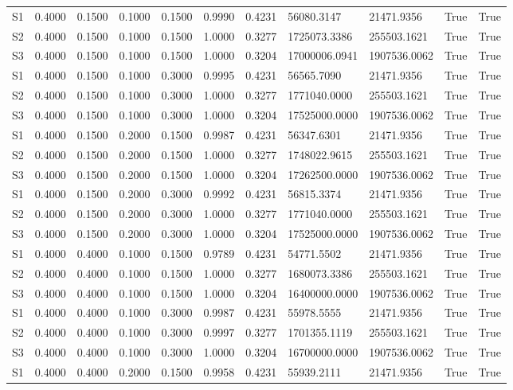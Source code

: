 \documentclass[11pt,a4paper]{article}
\begin{document}
\begin{landscape}
{\begin{longtable}{lllllllllll}
S1 & 0.4000 & 0.1500 & 0.1000 & 0.1500 & 0.9990 & 0.4231 & 56080.3147 & 21471.9356 & True & True \\
S2 & 0.4000 & 0.1500 & 0.1000 & 0.1500 & 1.0000 & 0.3277 & 1725073.3386 & 255503.1621 & True & True \\
S3 & 0.4000 & 0.1500 & 0.1000 & 0.1500 & 1.0000 & 0.3204 & 17000006.0941 & 1907536.0062 & True & True \\
S1 & 0.4000 & 0.1500 & 0.1000 & 0.3000 & 0.9995 & 0.4231 & 56565.7090 & 21471.9356 & True & True \\
S2 & 0.4000 & 0.1500 & 0.1000 & 0.3000 & 1.0000 & 0.3277 & 1771040.0000 & 255503.1621 & True & True \\
S3 & 0.4000 & 0.1500 & 0.1000 & 0.3000 & 1.0000 & 0.3204 & 17525000.0000 & 1907536.0062 & True & True \\
S1 & 0.4000 & 0.1500 & 0.2000 & 0.1500 & 0.9987 & 0.4231 & 56347.6301 & 21471.9356 & True & True \\
S2 & 0.4000 & 0.1500 & 0.2000 & 0.1500 & 1.0000 & 0.3277 & 1748022.9615 & 255503.1621 & True & True \\
S3 & 0.4000 & 0.1500 & 0.2000 & 0.1500 & 1.0000 & 0.3204 & 17262500.0000 & 1907536.0062 & True & True \\
S1 & 0.4000 & 0.1500 & 0.2000 & 0.3000 & 0.9992 & 0.4231 & 56815.3374 & 21471.9356 & True & True \\
S2 & 0.4000 & 0.1500 & 0.2000 & 0.3000 & 1.0000 & 0.3277 & 1771040.0000 & 255503.1621 & True & True \\
S3 & 0.4000 & 0.1500 & 0.2000 & 0.3000 & 1.0000 & 0.3204 & 17525000.0000 & 1907536.0062 & True & True \\
S1 & 0.4000 & 0.4000 & 0.1000 & 0.1500 & 0.9789 & 0.4231 & 54771.5502 & 21471.9356 & True & True \\
S2 & 0.4000 & 0.4000 & 0.1000 & 0.1500 & 1.0000 & 0.3277 & 1680073.3386 & 255503.1621 & True & True \\
S3 & 0.4000 & 0.4000 & 0.1000 & 0.1500 & 1.0000 & 0.3204 & 16400000.0000 & 1907536.0062 & True & True \\
S1 & 0.4000 & 0.4000 & 0.1000 & 0.3000 & 0.9987 & 0.4231 & 55978.5555 & 21471.9356 & True & True \\
S2 & 0.4000 & 0.4000 & 0.1000 & 0.3000 & 0.9997 & 0.3277 & 1701355.1119 & 255503.1621 & True & True \\
S3 & 0.4000 & 0.4000 & 0.1000 & 0.3000 & 1.0000 & 0.3204 & 16700000.0000 & 1907536.0062 & True & True \\
S1 & 0.4000 & 0.4000 & 0.2000 & 0.1500 & 0.9958 & 0.4231 & 55939.2111 & 21471.9356 & True & True \\

\end{longtable}}
\end{landscape}
\end{document}
